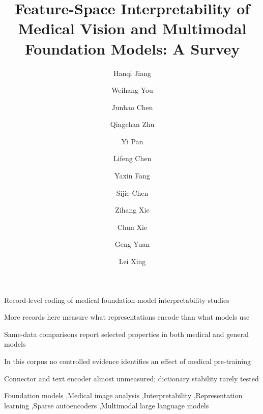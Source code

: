 \documentclass[final,3p,times,twocolumn,number,sort, compress]{elsarticle}
\begin{document}
\begin{frontmatter}

\title{Feature-Space Interpretability of Medical Vision and Multimodal Foundation Models: A Survey}

\author[uga,stan]{Hanqi Jiang}
\author[uga]{Weihang You}
\author[uga]{Junhao Chen}
\author[uga]{Qingchan Zhu}
\author[uga]{Yi Pan}
\author[uga]{Lifeng Chen}
\author[stan]{Yaxin Fang}
\author[stan]{Sijie Chen}
\author[jp1]{Zihang Xie}
\author[jp2]{Chun Xie}
\author[uga]{Geng Yuan}
\author[stan]{Lei Xing}



\begin{abstract}

\end{abstract}

\begin{highlights}
\item Record-level coding of \Ncore{} medical foundation-model interpretability studies
\item More records here measure what representations encode than what models use
\item Same-data comparisons report selected properties in both medical and general models
\item In this corpus no controlled evidence identifies an effect of medical pre-training
\item Connector and text encoder almost unmeasured; dictionary stability rarely tested
\end{highlights}
\hypersetup{pageanchor=true}

\begin{keyword}
Foundation models \sep Medical image analysis \sep Interpretability \sep Representation learning \sep Sparse autoencoders \sep Multimodal large language models
\end{keyword}

\end{frontmatter}
\end{document}
